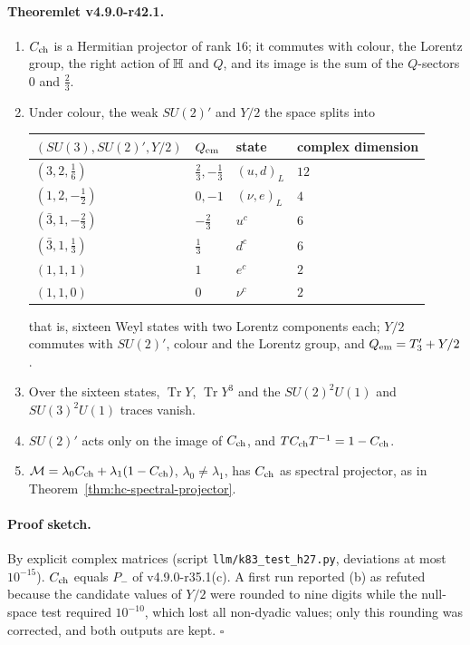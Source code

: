 \paragraph{Theoremlet v4.9.0-r42.1.}
\begin{enumerate}[leftmargin=2em]
\item[(a)] \(C_{\rm ch}\) is a Hermitian projector of rank \(16\); it commutes with colour, the Lorentz group, the right action of \(\mathbb{H}\)
and \(Q\), and its image is the sum of the \(Q\)-sectors \(0\) and \(\tfrac23\).
\item[(b)] Under colour, the weak \(SU(2)'\) and \(Y/2\) the space splits into
\begin{center}
\small
\begin{tabular}{@{}llll@{}}
\toprule
\((SU(3),SU(2)',Y/2)\) & \(Q_{\rm em}\) & state & complex dimension\\
\midrule
\((3,2,\tfrac16)\) & \(\tfrac23,-\tfrac13\) & \((u,d)_L\) & \(12\)\\
\((1,2,-\tfrac12)\) & \(0,-1\) & \((\nu,e)_L\) & \(4\)\\
\((\bar3,1,-\tfrac23)\) & \(-\tfrac23\) & \(u^c\) & \(6\)\\
\((\bar3,1,\tfrac13)\) & \(\tfrac13\) & \(d^c\) & \(6\)\\
\((1,1,1)\) & \(1\) & \(e^c\) & \(2\)\\
\((1,1,0)\) & \(0\) & \(\nu^c\) & \(2\)\\
\bottomrule
\end{tabular}
\end{center}
that is, sixteen Weyl states with two Lorentz components each; \(Y/2\) commutes with \(SU(2)'\), colour and the Lorentz group, and
\(Q_{\rm em}=T_3'+Y/2\).
\item[(c)] Over the sixteen states, \(\operatorname{Tr}Y\), \(\operatorname{Tr}Y^3\) and the \(SU(2)^2U(1)\) and \(SU(3)^2U(1)\) traces vanish.
\item[(d)] \(SU(2)'\) acts only on the image of \(C_{\rm ch}\), and \(TC_{\rm ch}T^{-1}=1-C_{\rm ch}\).
\item[(e)] \(\mathcal M=\lambda_0C_{\rm ch}+\lambda_1(1-C_{\rm ch})\), \(\lambda_0\neq\lambda_1\), has \(C_{\rm ch}\) as spectral projector, as in
Theorem~\ref{thm:hc-spectral-projector}.
\end{enumerate}

\paragraph{Proof sketch.}
By explicit complex matrices (script \texttt{llm/k83\_test\_h27.py}, deviations at most \(10^{-15}\)).  \(C_{\rm ch}\) equals \(P_-\) of
v4.9.0-r35.1(c).  A first run reported (b) as refuted because the candidate values of \(Y/2\) were rounded to nine digits while the
null-space test required \(10^{-10}\), which lost all non-dyadic values; only this rounding was corrected, and both outputs are kept.
\(\square\)

